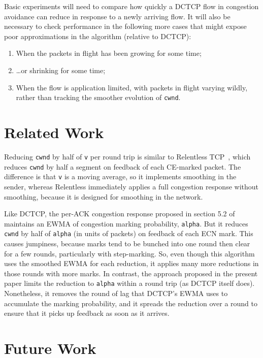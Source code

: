 Basic experiments will need to compare how quickly a DCTCP flow in congestion avoidance can reduce in response to a newly arriving flow. It will also be necessary to check performance in the following more cases that might expose poor approximations in the algorithm (relative to DCTCP):
\begin{enumerate}
	\item When the packets in flight has been growing for some time;
	\item \ldots{}or shrinking for some time;
	\item When the flow is application limited, with packets in flight varying wildly, rather than tracking the smoother evolution of \texttt{cwnd}.
\end{enumerate}

\section{Related Work}\label{prresp_related}

Reducing \texttt{cwnd} by half of \texttt{v} per round trip is similar to Relentless TCP~\cite{Mathis09:Relentless}, which reduces \texttt{cwnd} by half a segment on feedback of each CE-marked packet. The difference is that \texttt{v} is a moving average, so it implements smoothing in the sender, whereas Relentless immediately applies a full congestion response without smoothing, because it is designed for smoothing in the network.

Like DCTCP, the per-ACK congestion response proposed in section 5.2 of \cite{Alizadeh11:DCTCP_Analysis} maintains an EWMA of congestion marking probability, \texttt{alpha}. But it reduces \texttt{cwnd} by half of \texttt{alpha} (in units of packets) on feedback of each ECN mark. This causes jumpiness, because marks tend to be bunched into one round then clear for a few rounds, particularly with step-marking. So, even though this algorithm uses the smoothed EWMA for each reduction, it applies many more reductions in those rounds with more marks. In contrast, the approach proposed in the present paper limits the reduction to \texttt{alpha} within a round trip (as DCTCP itself does). Nonetheless, it removes the round of lag that DCTCP's EWMA uses to accumulate the marking probability, and it spreads the reduction over a round to ensure that it picks up feedback as soon as it arrives.

\section{Future Work}\label{prresp_future}

